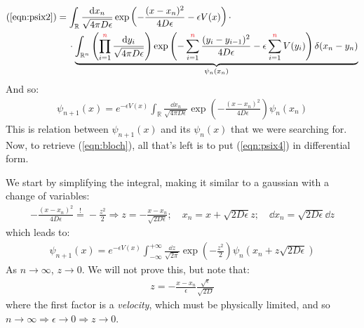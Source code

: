 \documentclass[../template.tex]{subfiles}
\begin{document}
\begin{align}
    (\ref{eqn:psix2}) \nonumber
 &= \int_{\mathbb{R}} \frac{\dd{x_n}}{\sqrt{4 \pi D \epsilon} } \exp\left(-\frac{(x- x_n)^2}{4 D \epsilon} - \epsilon V(x) \right) \cdot \\
    &\quad \> \cdot \underbrace{\int_{\mathbb{R}^{n}} \left(\prod_{i=1}^{\textcolor{Red}{n}} \frac{\dd{y_i}}{\sqrt{4 \pi D \epsilon}} \right) \exp\left(-\sum_{i=1}^{\textcolor{Red}{n}} \frac{(y_i - y_{i-1})^2}{4 D \epsilon}  - \epsilon\sum_{i=1}^{\textcolor{Red}{n}} V(y_i) \right) \delta(x_n - y_n)}_{\psi_n(x_n)} 
    \label{eqn:psix3}
\end{align} 
And so:
\begin{align}
    \psi_{n+1}(x) = e^{-\epsilon V(x)} \int_{\mathbb{R}} \frac{\dd{x_n}}{\sqrt{4 \pi D \epsilon }} \exp\left(-\frac{(x - x_n)^2}{4 D \epsilon} \right) \psi_n(x_n) 
    \label{eqn:psix4}
\end{align}
This is relation between $\psi_{n+1}(x)$ and its  $\psi_n(x)$ that we were searching for. Now, to retrieve (\ref{eqn:bloch}), all that's left is to put (\ref{eqn:psix4}) in differential form. 

We start by simplifying the integral, making it similar to a gaussian with a change of variables:
\begin{align*}
    - \frac{(x- x_n)^2}{4 D \epsilon} \overset{!}{=} - \frac{z^2}{2} \Rightarrow z = - \frac{x - x_n}{\sqrt{2 D \epsilon}}; \quad x_n = x + \sqrt{2 D \epsilon}z; \quad \dd{x_n} = \sqrt{2 D \epsilon} \dd{z}  
\end{align*}
which leads to:
\begin{align}
    \psi_{n+1}(x) = e^{-\epsilon V(x)} \int_{-\infty}^{+\infty} \frac{\dd{z}}{\sqrt{2 \pi}} \exp\left(-\frac{z^2}{2} \right) \psi_n(x_n + z \sqrt{2 D \epsilon})
    \label{eqn:psix5}
\end{align}
As $n \to \infty$, $z \to 0$. We will not prove this, but note that:
\begin{align*}
    z = - \frac{x-x_n}{\epsilon} \frac{\sqrt{\epsilon}}{\sqrt{2 D}}  
\end{align*}
where the first factor is a \textit{velocity}, which must be physically limited, and so $n \to \infty \Rightarrow \epsilon \to 0 \Rightarrow z \to 0$.
\end{document}
